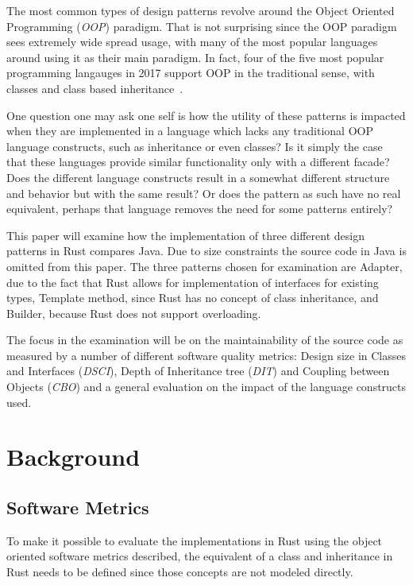 \documentclass[conference]{IEEEtran}
\begin{document}
The most common types of design patterns revolve around the Object Oriented Programming (\emph{OOP}) paradigm.
That is not surprising since the OOP paradigm sees extremely wide spread usage, with many of the most popular languages around using it as their main paradigm.
In fact, four of the five most popular programming langauges in 2017 support OOP in the traditional sense, with classes and class based inheritance~\cite{ieee:lang_usage}.

One question one may ask one self is how the utility of these patterns is impacted when they are implemented in a language which lacks any traditional OOP language constructs, such as inheritance or even classes?
Is it simply the case that these languages provide similar functionality only with a different facade?
Does the different language constructs result in a somewhat different structure and behavior but with the same result?
Or does the pattern as such have no real equivalent, perhaps that language removes the need for some patterns entirely?

This paper will examine how the implementation of three different design patterns in Rust compares Java.
Due to size constraints the source code in Java is omitted from this paper.
The three patterns chosen for examination are Adapter, due to the fact that Rust allows for implementation of interfaces for existing types, Template method, since Rust has no concept of class inheritance, and Builder, because Rust does not support overloading.

The focus in the examination will be on the maintainability of the source code as measured by a number of different software quality metrics: Design size in Classes and Interfaces (\emph{DSCI}), Depth of Inheritance tree (\emph{DIT}) and Coupling between Objects (\emph{CBO}) and a general evaluation on the impact of the language constructs used.

\section{Background}

\subsection{Software Metrics}
\label{sub:software_metrics}
To make it possible to evaluate the implementations in Rust using the object oriented software metrics described, the equivalent of a class and inheritance in Rust needs to be defined since those concepts are not modeled directly.
\end{document}
